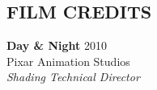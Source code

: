 \documentclass[line,margin]{res}
\begin{document}
\begin{resume}
\section{FILM CREDITS}

\newcommand{\filmcred}[4] {
	\textbf{#1} \hfill #2
	\\
	#3
	\\
	\emph{#4}
}

\filmcred
{Day \& Night}
{2010}
{Pixar Animation Studios}
{Shading Technical Director}








\end{resume}
\end{document}

